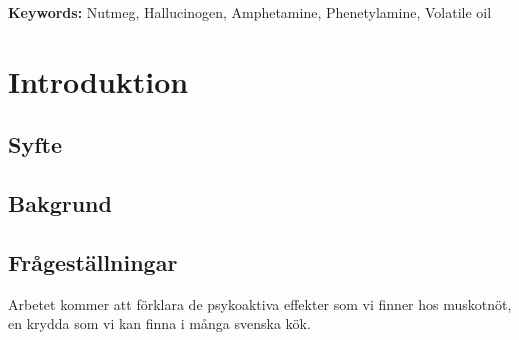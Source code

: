 \documentclass[a4paper,margin=3.25cm]{article}
\begin{document}
\begin{abstract}

	\end{abstract}

	\begin{flushleft}
		{\small {\bf Keywords:} Nutmeg, Hallucinogen, Amphetamine, Phenetylamine, Volatile oil}
	\end{flushleft}


	\tableofcontents

	\clearpage

	\section{Introduktion}
	\subsection{Syfte}

	\subsection{Bakgrund}

	\subsection{Frågeställningar}

%
%
%
Arbetet kommer att förklara de psykoaktiva effekter som vi finner hos muskotnöt, en krydda som vi kan finna i många svenska kök.
\end{document}
